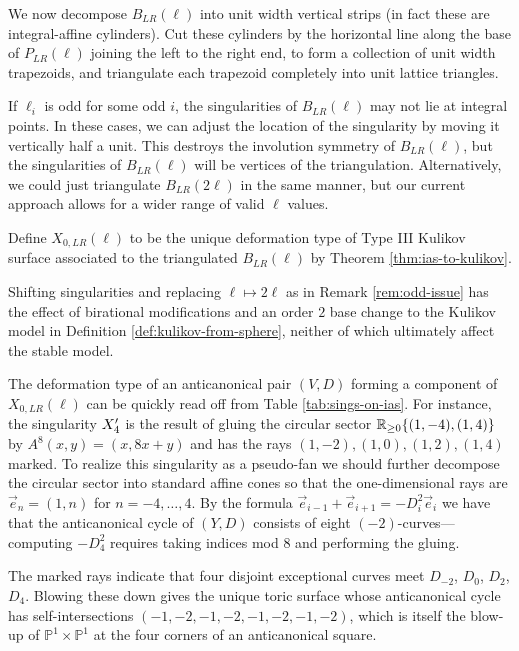 \documentclass[table,x11names]{amsart}
\begin{document}
\medskip

We now decompose $B_{LR}(\ell)$ into unit width vertical strips
(in fact these are integral-affine cylinders). Cut these cylinders by the horizontal line
along the base of $P_{LR}(\ell)$
joining the left to the right end, to form a collection of unit width trapezoids, and triangulate
each trapezoid completely into unit lattice triangles.

\begin{remark}\label{rem:odd-issue}  If $\ell_i$ is odd for some odd $i$,
the singularities of $B_{LR}(\ell)$ may not
lie at integral points. In these cases, we can adjust the location of the singularity by moving
it vertically half a unit. This destroys the involution symmetry of $B_{LR}(\ell)$, but
the singularities of $B_{LR}(\ell)$ will be vertices of the triangulation.
Alternatively, we could just triangulate $B_{LR}(2\ell)$ in the same manner,
but our current approach allows
for a wider range of valid $\ell$ values.
\end{remark}
 
\begin{definition}\label{def:kulikov-from-sphere}
Define $X_{0,LR}(\ell)$ to be the unique deformation type of Type III Kulikov surface
associated to the triangulated $B_{LR}(\ell)$ by Theorem \ref{thm:ias-to-kulikov}.\end{definition}

Shifting singularities and replacing $\ell\mapsto 2\ell$ 
as in Remark \ref{rem:odd-issue} has the effect  \cite[Sec.~4]{engel2021smoothings}
of birational modifications and an order $2$ base change
to the Kulikov model in Definition \ref{def:kulikov-from-sphere},
neither of which ultimately affect the stable model.

\begin{example} The deformation type of an anticanonical pair $(V,D)$ forming a component
of $X_{0,LR}(\ell)$ can be quickly read off from Table \ref{tab:sings-on-ias}. For instance,
the singularity $X'_4$ is the result of gluing the circular sector $\mathbb{R}_{\geq 0}\{(1,-4),(1,4)\}$ by
$A^8(x,y)=(x,8x+y)$ and has the rays $(1,-2),(1,0),(1,2),(1,4)$ marked. To realize this singularity
as a pseudo-fan we should further decompose the circular sector into standard affine cones
so that the one-dimensional rays
are $\vec{e}_n=(1,n)$ for $n=-4,\dots,4$. By the formula $\vec{e}_{i-1}+\vec{e}_{i+1} = -D_i^2 \vec{e}_i$
we have that the anticanonical cycle of $(Y,D)$
consists of eight $(-2)$-curves---computing
$-D_4^2$ requires taking indices mod $8$ and performing the gluing.

The marked rays indicate that four disjoint exceptional curves
meet $D_{-2}$, $D_0$, $D_2$, $D_4$.
Blowing these down gives the unique toric surface
whose anticanonical cycle has self-intersections
$(-1,-2,-1,-2,-1,-2,-1,-2)$, which is itself the blow-up
of $\mathbb{P}^1\times \mathbb{P}^1$ at the four corners of an anticanonical
square. \end{example} 
\end{document}
